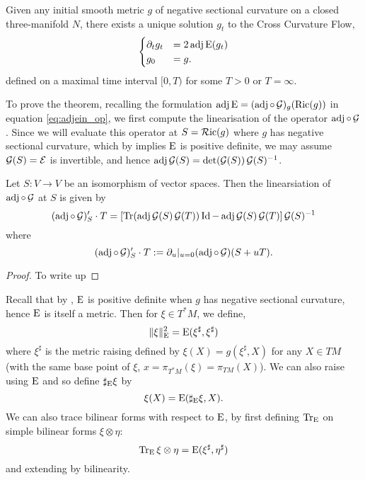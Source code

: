 \documentclass[a4paper, 12pt]{amsart}
\begin{document}
\begin{thm}
\label{thm:xcf_existence_uniqueness}

Given any initial smooth metric \(g\) of negative sectional curvature on a closed three-manifold \(N\), there exists a unique solution \(g_t\) to the Cross Curvature Flow,
\[
\begin{cases}
\partial_t g_t &= 2\operatorname{adj}\operatorname{E}(g_t) \\
g_0 &= g.
\end{cases}
\]
defined on a maximal time interval \([0, T)\) for some \(T > 0\) or \(T = \infty\).
\end{thm}

To prove the theorem, recalling the formulation \(\operatorname{adj}\operatorname{E} = (\operatorname{adj}\circ\operatorname{\mathcal{G}})_g (\operatorname{Ric}(g))\) in equation \eqref{eq:adjein_op}, we first compute the linearisation of the operator \(\operatorname{adj} \circ \operatorname{\mathcal{G}}\). Since we will evaluate this operator at \(S = \operatorname{\mathcal{R}ic}(g)\) where \(g\) has negative sectional curvature, which by  implies \(\operatorname{E}\) is positive definite, we may assume \(\operatorname{\mathcal{G}}(S) = \operatorname{\mathcal{E}}\) is invertible, and hence \(\operatorname{adj} \operatorname{\mathcal{G}}(S) = \det(\operatorname{\mathcal{G}}(S)) \operatorname{\mathcal{G}}(S)^{-1}\).

\begin{lemma}
\label{lem:dadjG}

Let \(S : V \to V\) be an isomorphism of vector spaces. Then the linearsiation of \(\operatorname{adj} \circ \operatorname{\mathcal{G}}\) at \(S\) is given by
\[
(\operatorname{adj} \circ \operatorname{\mathcal{G}})'_S \cdot T  = \left[\operatorname{Tr}(\operatorname{adj}\operatorname{\mathcal{G}}(S) \operatorname{\mathcal{G}}(T))\operatorname{Id} - \operatorname{adj}\operatorname{\mathcal{G}}(S) \operatorname{\mathcal{G}}(T)\right] \operatorname{\mathcal{G}}(S)^{-1}
\]
where
\[
(\operatorname{adj} \circ \operatorname{\mathcal{G}})'_S \cdot T := \partial_u|_{u=0} (\operatorname{adj} \circ \operatorname{\mathcal{G}}) (S + uT).
\]
\end{lemma}

\begin{proof}
{\color{red} To write up}
\end{proof}

Recall that by , \(\operatorname{E}\) is positive definite when \(g\) has negative sectional curvature, hence \(\operatorname{E}\) is itself a metric. Then for \(\xi \in T^{\ast} M\), we define,
\[
\|\xi\|_{\operatorname{E}}^2 = \operatorname{E}(\xi^{\sharp}, \xi^{\sharp})
\]
where \(\xi^{\sharp}\) is the metric raising defined by \(\xi(X) = g(\xi^{\sharp}, X)\) for any \(X \in TM\) (with the same base point of \(\xi\), \(x = \pi_{T^{\ast}M} (\xi) = \pi_{TM} (X)\)). We can also raise using \(\operatorname{E}\) and so define \(\sharp_{\operatorname{E}} \xi\) by
\[
\xi(X) = \operatorname{E}(\sharp_{\operatorname{E}} \xi, X).
\]
We can also trace bilinear forms with respect to \(\operatorname{E}\), by first defining \(\operatorname{Tr}_{\operatorname{E}}\) on simple bilinear forms \(\xi \otimes \eta\):
\[
\operatorname{Tr}_{\operatorname{E}} \xi \otimes \eta = \operatorname{E}(\xi^{\sharp}, \eta^{\sharp})
\]
and extending by bilinearity.
\end{document}
